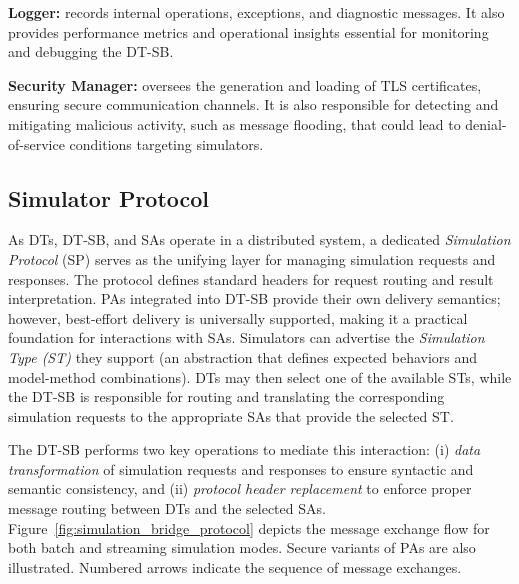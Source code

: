\noindent\textbf{Logger:}  
records internal operations, exceptions, and diagnostic messages. It also provides performance metrics and operational insights essential for monitoring and debugging the DT-SB.

\noindent\textbf{Security Manager:}  
oversees the generation and loading of TLS certificates, ensuring secure communication channels. It is also responsible for detecting and mitigating malicious activity, such as message flooding, that could lead to denial-of-service conditions targeting simulators.

\subsection{Simulator Protocol}
\label{subsec:sim-protocol}

As DTs, DT-SB, and SAs operate in a distributed system, a dedicated \emph{Simulation Protocol} (SP) serves as the unifying layer for managing simulation requests and responses. The protocol defines standard headers for request routing and result interpretation. PAs integrated into DT-SB provide their own delivery semantics; however, best-effort delivery is universally supported, making it a practical foundation for interactions with SAs. Simulators can advertise the \emph{Simulation Type (ST)} they support (an abstraction that defines expected behaviors and model-method combinations). DTs may then select one of the available STs, while the DT-SB is responsible for routing and translating the corresponding simulation requests to the appropriate SAs that provide the selected ST.

The DT-SB performs two key operations to mediate this interaction:
(i) \emph{data transformation} of simulation requests and responses to ensure syntactic and semantic consistency, and
(ii) \emph{protocol header replacement} to enforce proper message routing between DTs and the selected SAs.
Figure~\ref{fig:simulation_bridge_protocol} depicts the message exchange flow for both batch and streaming simulation modes.
Secure variants of PAs are also illustrated. 
Numbered arrows indicate the sequence of message exchanges.


